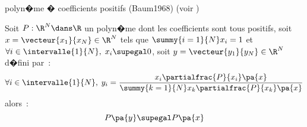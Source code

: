         \begin{xcorollary}{polyn�me � coefficients positifs (Baum1968)} \label{hmm_theorem_baumwelch_un} (voir )
        
        Soit $P : \R^N \dans \R$ un polyn�me dont les coefficients sont tous positifs, 
        soit $x = \vecteur{x_1}{x_N} \in \R^N$ tels que $\summy{i=1}{N}x_i = 1$ et $\forall i \in \intervalle{1}{N}, 
                \; x_i \supegal 0$, 
        soit $y = \vecteur{y_1}{y_N} \in \R^N$ d�fini par~:
                $$
                \forall i \in \intervalle{1}{N}, \; y_i = \frac{x_i \partialfrac{P}{x_i}\pa{x}}{\summy{k=1}{N}x_k \partialfrac{P}{x_k}\pa{x}}
                $$
        alors~:
                $$
                P\pa{y} \supegal P\pa{x}
                $$
        \end{xcorollary}



